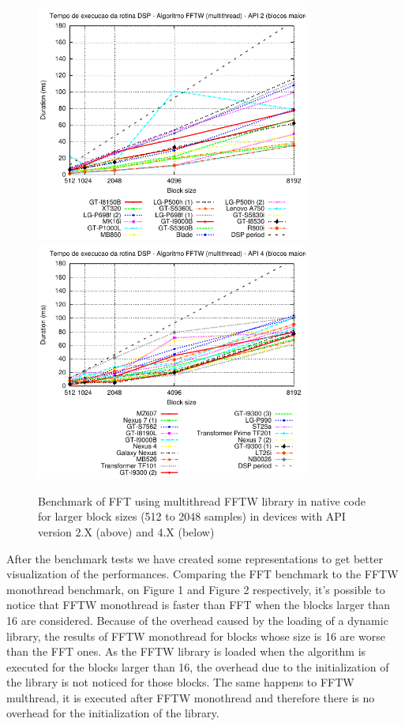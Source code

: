 \documentclass[12pt]{article}
\begin{document}
\begin{figure}[h!]
\begin{center}
\includegraphics[width=0.8\textwidth]{img/FFTW_MULTI-2-b.pdf}
\includegraphics[width=0.8\textwidth]{img/FFTW_MULTI-4-b.pdf}
\end{center}
\caption{Benchmark of FFT using multithread FFTW library in native code for larger block
sizes (512 to 2048 samples) in devices with API version 2.X (above) and 4.X
(below)}
\label{fig:alg-fft2}
\end{figure}


After the benchmark tests we have created some representations to get better
visualization of the performances.  Comparing the FFT benchmark to the FFTW
monothread benchmark, on Figure 1 and Figure 2 respectively, it's possible to
notice that FFTW monothread is faster than FFT when the blocks larger than 16
are considered.  Because of the overhead caused by the loading of a dynamic
library, the results of FFTW monothread for blocks whose size is 16 are worse
than the FFT ones.  As the FFTW library is loaded when the algorithm is
executed for the blocks larger than 16, the overhead due to the initialization
of the library is not noticed for those blocks. The same happens to FFTW
multhread, it is executed after FFTW monothread and therefore there is no
overhead for the initialization of the library.
\end{document}
